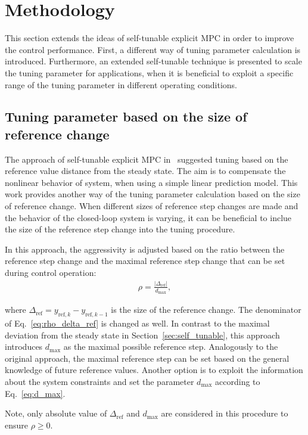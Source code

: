 \documentclass[preprint,12pt]{elsarticle}
\begin{document}
\section{Methodology}
\label{sec:methodology}
This section extends the ideas of self-tunable explicit MPC in order to improve the control performance. First, a different way of tuning parameter calculation is introduced. Furthermore, an extended self-tunable technique is presented to scale the tuning parameter for applications, when it is beneficial to exploit a specific range of the tuning parameter in different operating conditions. 


\subsection{Tuning parameter based on the size of reference change}
\label{sec:self_tunable_delta_ref}
The approach of self-tunable explicit MPC in~\cite{self_tunable} suggested tuning based on the reference value distance from the steady state. The aim is to compensate the nonlinear behavior of system, when using a simple linear prediction model. This work provides another way of the tuning parameter calculation based on the size of reference change. When different sizes of reference step changes are made and the behavior of the closed-loop system is varying, it can be beneficial to inclue the size of the reference step change into the tuning procedure.

In this approach, the aggressivity is adjusted based on the ratio between the reference step change and the maximal reference step change that can be set during control operation:
\begin{eqnarray}
	\label{eq:rho_delta_ref}
	\rho = \frac{\vert \Delta_{\mathrm{ref}} \vert}{d_{\max}},
\end{eqnarray} 

where $\Delta_{\mathrm{ref}} = y_{\mathrm{ref},k}-y_{\mathrm{ref},k-1}$ is the size of the reference change. The denominator of Eq.~\eqref{eq:rho_delta_ref} is changed as well. In contrast to the maximal deviation from the steady state in Section~\ref{sec:self_tunable}, this approach introduces $d_{\max}$ as the maximal possible reference step. 
Analogously to the original approach, the maximal reference step can be set based on the general knowledge of future reference values. Another option is to exploit the information about the system constraints and set the parameter $d_{\max}$ according to Eq.~\eqref{eq:d_max}. 
 
Note, only absolute value of $\Delta_{\mathrm{ref}}$ and $d_{\max}$ are considered in this procedure to ensure $\rho \ge 0$. 
\end{document}
